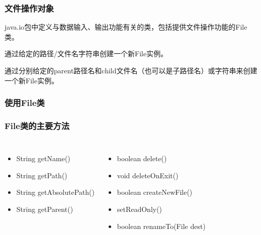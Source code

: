 \begin{frame}[fragile] %
  \frametitle{文件操作对象}


  java.io包中定义与数据输入、输出功能有关的类，包括提供文件操作功能的File类。
  

  通过给定的路径/文件名字符串创建一个新File实例。
  

  通过分别给定的parent路径名和child文件名（也可以是子路径名）或字符串来创建一个新File实例。
\end{frame}

\begin{frame}[fragile] %
  \frametitle{使用File类}


\end{frame}

\begin{frame}[fragile] %
  \frametitle{File类的主要方法~} 

  \begin{columns}


    \begin{itemize}
    \item String getName() 
    \item String getPath() 
    \item String getAbsolutePath() 
    \item String getParent()
    \end{itemize}


    
    \begin{itemize}
    \item boolean delete() 
    \item void deleteOnExit() 
    \item boolean createNewFile() 
    \item setReadOnly() 
    \item boolean renameTo(File dest)
    \end{itemize}
  \end{columns}
\end{frame}

